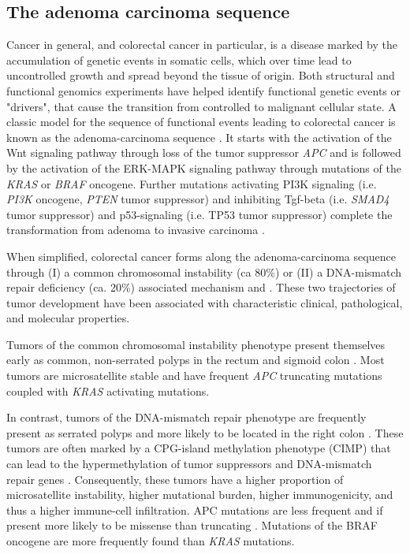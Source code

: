 \begin{flushleft}
\subsection{The adenoma carcinoma sequence}
Cancer in general, and colorectal cancer in particular, is a disease marked by the accumulation of genetic events in somatic cells, which over time lead to uncontrolled growth and spread beyond the tissue of origin. Both structural and functional genomics experiments have helped identify functional genetic events or "drivers", that cause the transition from controlled to malignant cellular state. A classic model for the sequence of functional events leading to colorectal cancer is known as the adenoma-carcinoma sequence \parencite{vogelsteinGeneticAlterationsColorectaltumor1988}. It starts with the activation of the Wnt signaling pathway through loss of the tumor suppressor \textit{APC} and is followed by the activation of the ERK-MAPK signaling pathway through mutations of the \textit{KRAS} or \textit{BRAF} oncogene. Further mutations activating PI3K signaling (i.e. \textit{PI3K} oncogene, \textit{PTEN} tumor suppressor) and inhibiting Tgf-beta (i.e. \textit{SMAD4} tumor suppressor) and p53-signaling (i.e. TP53 tumor suppressor) complete the transformation from adenoma to invasive carcinoma \parencite{fearonMolecularGeneticsColorectal2011}. \par

When simplified, colorectal cancer forms along the adenoma-carcinoma sequence through (I) a common chromosomal instability (ca 80\%) or (II) a DNA-mismatch repair deficiency (ca. 20\%) associated mechanism \parencite{markowitzMolecularOriginsCancer2009} and \parencite{pancioneGeneticEpigeneticEvents2012}. These two trajectories of tumor development have been associated with characteristic clinical, pathological, and molecular properties. 
\par

Tumors of the common chromosomal instability phenotype present themselves early as common, non-serrated polyps in the rectum and sigmoid colon \parencite{markowitzMolecularOriginsCancer2009}. Most tumors are microsatellite stable and have frequent \textit{APC} truncating mutations coupled with \textit{KRAS} activating mutations. 
\par 

In contrast, tumors of the DNA-mismatch repair phenotype are frequently present as serrated polyps and more likely to be located in the right colon \parencite{markowitzMolecularOriginsCancer2009}. These tumors are often marked by a CPG-island methylation phenotype (CIMP) that can lead to the hypermethylation of tumor suppressors and DNA-mismatch repair genes \parencite{oginoCpGIslandMethylator2009}. Consequently, these tumors have a higher proportion of microsatellite instability, higher mutational burden, higher immunogenicity, and thus a higher immune-cell infiltration. APC mutations are less frequent and if present more likely to be missense than truncating \parencite{borowskyRoleAPCWNT2018}. Mutations of the BRAF oncogene are more frequently found than \textit{KRAS} mutations. 
\par


\end{flushleft}
